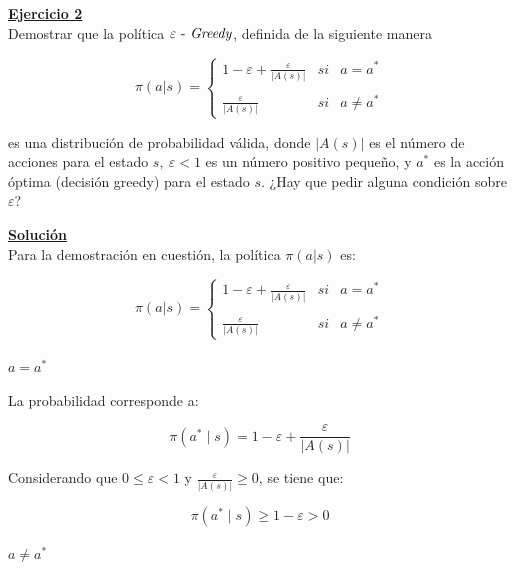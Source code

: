 \indent\underline{\textbf{Ejercicio 2}}\\
Demostrar que la política $\varepsilon \text{ - \textit{Greedy}}$, definida de la siguiente manera

\begin{equation}
    \pi(a|s) = \left\{
    \begin{array}{lcc}
        1 - \varepsilon + \frac{\varepsilon}{|A(s)|} & si & a = a^{\ast}    \\ \\
        \frac{\varepsilon}{|A(s)|} & si & a \neq a^{\ast}
    \end{array}
    \right.\label{eq:equation}
\end{equation}

es una distribución de probabilidad válida, donde $|A(s)|$ es el número de acciones para el estado $s, \ \varepsilon < 1$ es un número positivo pequeño, y $a^{\ast}$ es la acción óptima (decisión greedy) para el estado $s$.
¿Hay que pedir alguna condición sobre $\varepsilon$?

\indent\underline{\textbf{Solución}}\\

Para la demostración en cuestión, la política $\pi(a|s)$ es:

\begin{equation}
    \pi(a|s) = \left\{
    \begin{array}{lcc}
        1 - \varepsilon + \frac{\varepsilon}{|A(s)|} & si & a = a^{\ast}    \\ \\
        \frac{\varepsilon}{|A(s)|} & si & a \neq a^{\ast}
    \end{array}
    \right.
    \label{eq:equation2}
\end{equation}

\paragraph{$a=a^{\ast}$}

La probabilidad corresponde a:

\[
    \pi \left(a^{\ast} \mid s\right) = 1 - \varepsilon + \frac{\varepsilon}{|A(s)|}
\]

Considerando que $0 \leq \varepsilon < 1$ y $\frac{\varepsilon}{|A(s)|} \geq 0$, se tiene que:

\[
    \pi \left(a^{\ast} \mid s\right) \geq 1 - \varepsilon > 0
\]




\paragraph{$a \neq a^{\ast}$}

